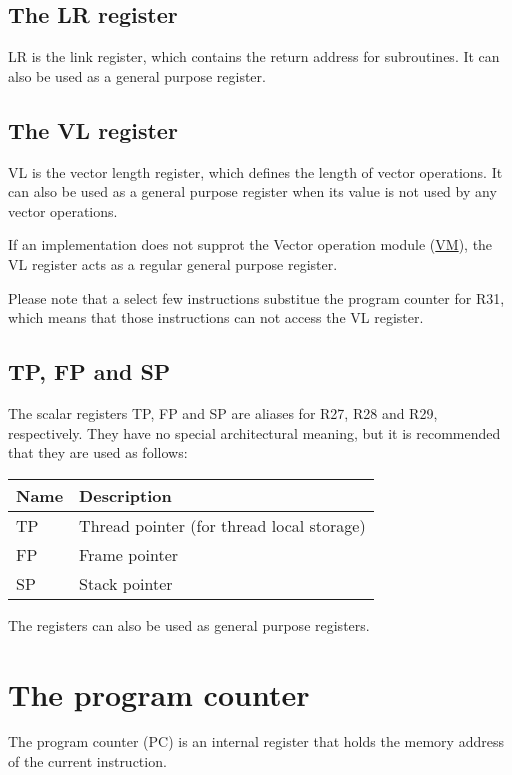\subsection{The LR register}

LR is the link register, which contains the return address for subroutines. It
can also be used as a general purpose register.

\subsection{The VL register}

VL is the vector length register, which defines the length of vector
operations. It can also be used as a general purpose register when its value
is not used by any vector operations.

If an implementation does not supprot the Vector operation module
(\hyperref[module:VM]{VM}), the VL register acts as a regular general purpose
register.

Please note that a select few instructions substitue the program counter for
R31, which means that those instructions can not access the VL register.

\subsection{TP, FP and SP}

The scalar registers TP, FP and SP are aliases for R27, R28 and R29,
respectively. They have no special architectural meaning, but it is recommended
that they are used as follows:

\begin{tabular}{|l|l|}
  \hline
  \textbf{Name} & \textbf{Description} \\
  \hline
  TP & Thread pointer (for thread local storage) \\
  \hline
  FP & Frame pointer \\
  \hline
  SP & Stack pointer \\
  \hline
\end{tabular}

The registers can also be used as general purpose registers.

\section{The program counter}

The program counter (PC) is an internal register that holds the memory address
of the current instruction.

